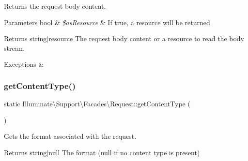 Returns the request body content.


\begin{DoxyParams}[1]{Parameters}
bool & {\em \$as\+Resource} & If true, a resource will be returned \\
\hline
\end{DoxyParams}
\begin{DoxyReturn}{Returns}
string$\vert$resource The request body content or a resource to read the body stream 
\end{DoxyReturn}

\begin{DoxyExceptions}{Exceptions}
{\em } & \\
\hline
\end{DoxyExceptions}
\mbox{\label{class_illuminate_1_1_support_1_1_facades_1_1_request_a0566566f7856c8b38d190298600a86e5}} 
\subsubsection{\texorpdfstring{get\+Content\+Type()}{getContentType()}}
{\footnotesize\ttfamily static Illuminate\textbackslash{}\+Support\textbackslash{}\+Facades\textbackslash{}\+Request\+::get\+Content\+Type (\begin{DoxyParamCaption}{ }\end{DoxyParamCaption})\hspace{0.3cm}{\ttfamily [static]}}

Gets the format associated with the request.

\begin{DoxyReturn}{Returns}
string$\vert$null The format (null if no content type is present) 
\end{DoxyReturn}
\mbox{\label{class_illuminate_1_1_support_1_1_facades_1_1_request_a5031981f11ab07f0bd8df4d4c5b98d0a}} 
